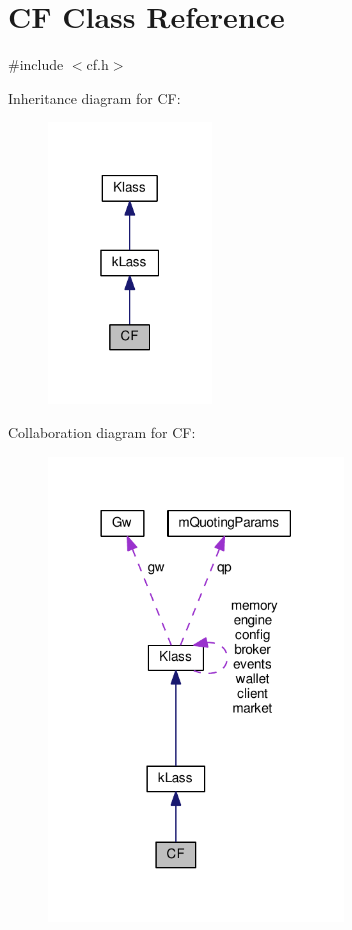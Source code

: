 \hypertarget{class_k_1_1_c_f}{}\section{CF Class Reference}
\label{class_k_1_1_c_f}


{\ttfamily \#include $<$cf.\+h$>$}



Inheritance diagram for CF\+:
\nopagebreak
\begin{figure}[H]
\begin{center}
\leavevmode
\includegraphics[width=123pt]{class_k_1_1_c_f__inherit__graph}
\end{center}
\end{figure}


Collaboration diagram for CF\+:
\nopagebreak
\begin{figure}[H]
\begin{center}
\leavevmode
\includegraphics[width=222pt]{class_k_1_1_c_f__coll__graph}
\end{center}
\end{figure}
